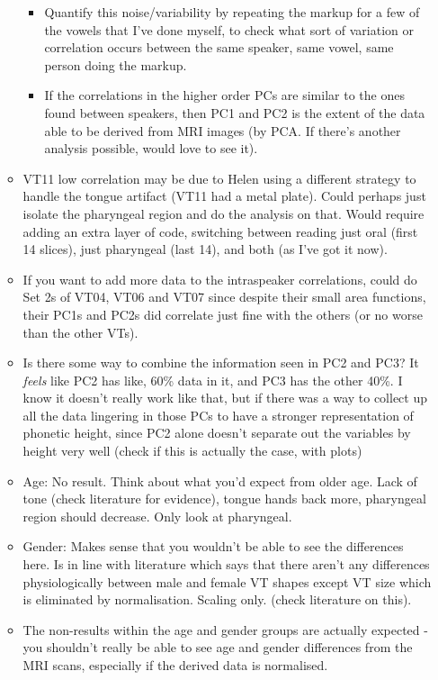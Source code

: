\documentclass{article}
\begin{document}
\begin{itemize}
\begin{itemize}
\begin{itemize}
            \item Quantify this noise/variability by repeating the markup for a few of the vowels that I've done myself, to check what sort of variation or correlation occurs between the same speaker, same vowel, same person doing the markup.
            \item If the correlations in the higher order PCs are similar to the ones found between speakers, then PC1 and PC2 is the extent of the data able to be derived from MRI images (by PCA. If there's another analysis possible, would love to see it).
        \end{itemize}
        \item VT11 low correlation may be due to Helen using a different strategy to handle the tongue artifact (VT11 had a metal plate). Could perhaps just isolate the pharyngeal region and do the analysis on that. Would require adding an extra layer of code, switching between reading just oral (first 14 slices), just pharyngeal (last 14), and both (as I've got it now).
        \item If you want to add more data to the intraspeaker correlations, could do Set 2s of VT04, VT06 and VT07 since despite their small area functions, their PC1s and PC2s did correlate just fine with the others (or no worse than the other VTs).
        \item Is there some way to combine the information seen in PC2 and PC3? It \textit{feels} like PC2 has like, 60\% data in it, and PC3 has the other 40\%. I know it doesn't really work like that, but if there was a way to collect up all the data lingering in those PCs to have a stronger representation of phonetic height, since PC2 alone doesn't separate out the variables by height very well (check if this is actually the case, with plots)
        \item Age: No result. Think about what you'd expect from older age. Lack of tone (check literature for evidence), tongue hands back more, pharyngeal region should decrease. Only look at pharyngeal.
        \item Gender: Makes sense that you wouldn't be able to see the differences here. Is in line with literature which says that there aren't any differences physiologically between male and female VT shapes except VT size which is eliminated by normalisation. Scaling only. (check literature on this).
        \item The non-results within the age and gender groups are actually expected - you shouldn't really be able to see age and gender differences from the MRI scans, especially if the derived data is normalised.

\end{itemize}
\end{itemize}
\end{document}
